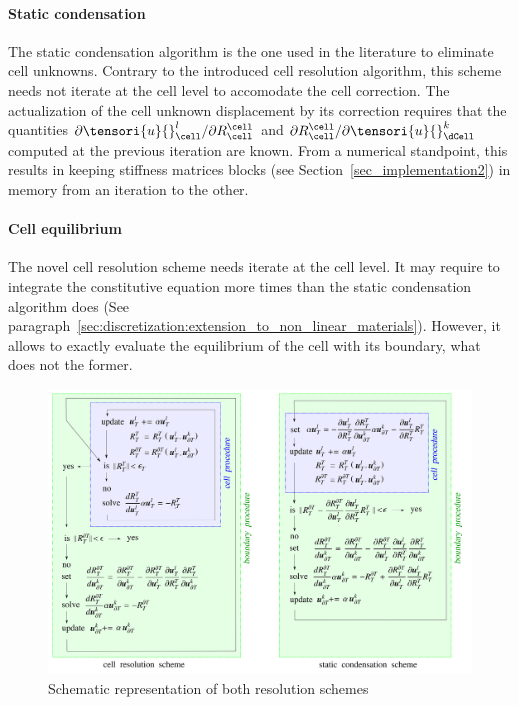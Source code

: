 \paragraph{Static condensation}

The static condensation algorithm is the one used in the literature
\cite{di_pietro_discontinuous-skeletal_2015,cockburn_algorithm_2019,abbas_hybrid_2019-1,abbas_hybrid_2018}
to eliminate cell unknowns. Contrary to the introduced cell resolution
algorithm, this scheme needs not iterate at the cell level to accomodate
the cell correction. The actualization of the cell unknown displacement
by its correction requires that the quantities $\partial
\tensori{u}{}_{\cell}^l / \partial R_{\cell}^{\cell}$ and $\partial
R_{\cell}^{\cell} / \partial \tensori{u}{}_{\dCell}^k$ computed at the
previous iteration are known. From a numerical standpoint, this results
in keeping stiffness matrices blocks (see
Section~\ref{sec_implementation2}) in memory from an iteration to the
other.

\paragraph{Cell equilibrium}

The novel cell resolution scheme needs iterate at the cell level. It
may require to integrate the constitutive equation more times than the
static condensation algorithm does (See
paragraph~\ref{sec:discretization:extension_to_non_linear_materials}).
However, it allows to exactly evaluate the equilibrium of the cell with
its boundary, what does not the former.

\begin{figure}[H]
    \centering
    \includegraphics[width=15.cm]{img_calcs/resolution.png}
    \caption{Schematic representation of both resolution schemes}
    \label{fig_resolution}
\end{figure}

